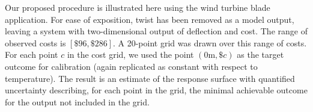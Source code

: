 \documentclass[twocolumn,10pt]{asme2ej}
\begin{document}
%
Our proposed procedure is illustrated here using the wind turbine blade application.
%
For ease of exposition, twist has been removed as a model output, leaving a system with two-dimensional output of deflection and cost. 
%
The range of observed costs is $[\$96,\$286]$.
%
A 20-point grid was drawn over this range of costs. 
%
%
For each point $c$ in the cost grid, we used the point $(0\mathrm m,\$c)$ as the target outcome for calibration (again replicated as constant with respect to temperature). The result is an estimate of the response surface with quantified uncertainty describing, for each point in the grid, the minimal achievable outcome for the output not included in the grid.
%

%
\end{document}
